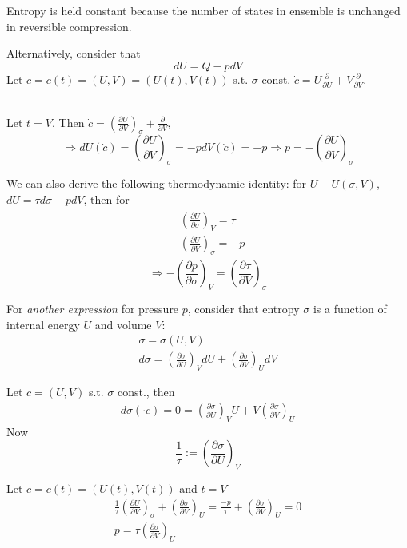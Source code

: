 Entropy is held constant because the number of states in ensemble is unchanged in reversible compression.

Alternatively, consider that 
\[
dU = Q - pdV
\]
Let $c= c(t) = (U,V) = (U(t), V(t))$ s.t. $\sigma$ const. $\dot{c} = \dot{U} \frac{ \partial }{\partial U} + \dot{V} \frac{ \partial }{ \partial V}$.

\quad \\ 
Let $t=V$. Then $\dot{c} = \left(\frac{\partial U}{\partial V} \right)_{\sigma} + \frac{\partial}{\partial V}$, 
\begin{equation}
\Longrightarrow dU(\dot{c}) = \left( \frac{ \partial U}{ \partial V} \right)_{\sigma} = -pdV (\dot{c}) = -p \Longrightarrow \boxed{ p = - \left( \frac{ \partial U}{ \partial V} \right)_{\sigma} }
\end{equation} 

We can also derive the following thermodynamic identity: for $U- U(\sigma, V)$, $dU = \tau d\sigma - pdV$, then for
\[
\begin{gathered}
\begin{aligned}
& \left( \frac{ \partial U}{ \partial \sigma} \right)_V = \tau \\
& \left( \frac{ \partial U}{ \partial V} \right)_{\sigma}  = -p 
\end{aligned}
\end{gathered}
\]
\begin{equation}
\Longrightarrow \boxed{ - \left( \frac{ \partial p }{ \partial \sigma} \right)_V =  \left( \frac{ \partial \tau}{ \partial V} \right)_{\sigma} } 
\end{equation}

For \emph{another expression} for pressure $p$, consider that entropy $\sigma$ is a function of internal energy $U$ and volume $V$:
\[
\begin{gathered}
	\sigma = \sigma(U,V) \\ 
	d\sigma = \left(\frac{ \partial \sigma }{\partial U } \right)_V dU + \left(\frac{ \partial \sigma }{\partial V } \right)_U dV 
\end{gathered}
\]

Let $c=(U,V)$ s.t. $\sigma$ const., then 
\[
\begin{gathered}
d\sigma(\cdot{c}) = 0 = \left( \frac{ \partial \sigma}{ \partial U} \right)_V \dot{U} + \dot{V} \left( \frac{\partial \sigma}{\partial V} \right)_U
\end{gathered}
\]
Now
\[
\frac{1}{\tau} := \left( \frac{ \partial \sigma}{ \partial U} \right)_V
\]

Let $c=c(t) = (U(t), V(t))$ and $t=V$
\[
\begin{gathered} 
\frac{1}{\tau} \left( \frac{ \partial U}{ \partial V} \right)_{\sigma} + \left( \frac{ \partial \sigma }{ \partial V} \right)_U = \frac{-p}{\tau} + \left(\frac{ \partial \sigma}{\partial V} \right)_U = 0 \\
p = \tau \left( \frac{\partial \sigma}{ \partial V} \right)_U
\end{gathered}
\]


